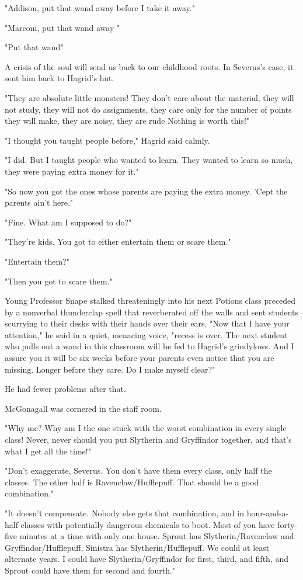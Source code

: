 "Addison, put that wand away before I take it away."

"Marconi, put that wand away "

"Put that wand{\el}"

A crisis of the soul will send us back to our childhood roots. In Severus's case, it sent him back to Hagrid's hut.

"They are absolute little monsters! They don't care about the material, they will not study, they will not do assignments, they care only for the number of points they will make, they are noisy, they are rude{\el} Nothing is worth this!"

"I thought you taught people before," Hagrid said calmly.

"I did. But I taught people who wanted to learn. They wanted to learn so much, they were paying extra money for it."

"So now you got the ones whose parents are paying the extra money. 'Cept the parents ain't here."

"Fine. What am I supposed to do?"

"They're kids. You got to either entertain them or scare them."

"Entertain them?"

"Then you got to scare them."

Young Professor Snape stalked threateningly into his next Potions class preceded by a nonverbal thunderclap spell that reverberated off the walls and sent students scurrying to their desks with their hands over their ears. "Now that I have your attention," he said in a quiet, menacing voice, "recess is over. The next student who pulls out a wand in this classroom will be fed to Hagrid's grindylows. And I assure you it will be six weeks before your parents even notice that you are missing. Longer before they care. Do I make myself clear?"

He had fewer problems after that.

McGonagall was cornered in the staff room.

"Why me? Why am I the one stuck with the worst combination in every single class! Never, never should you put Slytherin and Gryffindor together, and that's what I get all the time!"

"Don't exaggerate, Severus. You don't have them every class, only half the classes. The other half is Ravenclaw\slash Hufflepuff. That should be a good combination."

"It doesn't compensate. Nobody else gets that combination, and in hour-and-a-half classes with potentially dangerous chemicals to boot. Most of you have forty-five minutes at a time with only one house. Sprout has Slytherin\slash Ravenclaw and Gryffindor\slash Hufflepuff, Sinistra has Slytherin\slash Hufflepuff. We could at least alternate years. I could have Slytherin\slash Gryffindor for first, third, and fifth, and Sprout could have them for second and fourth."

